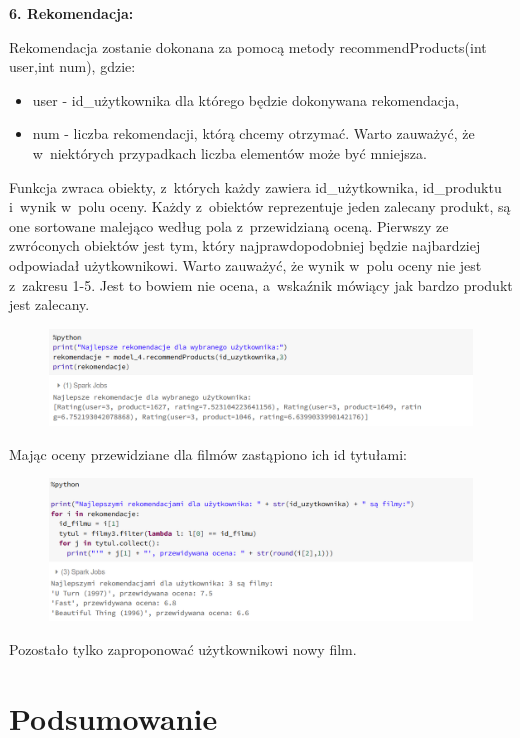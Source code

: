 \documentclass[12pt,a4paper]{report}
\begin{document}
\textbf{6. Rekomendacja:}

Rekomendacja zostanie dokonana za pomocą metody recommendProducts(int user,int num), gdzie:
\begin{itemize}
\item user - id\_użytkownika dla którego będzie dokonywana rekomendacja,
\item num - liczba rekomendacji, którą chcemy otrzymać. Warto zauważyć, że w~niektórych przypadkach liczba elementów może być mniejsza.
\end{itemize}

Funkcja zwraca obiekty, z~których każdy zawiera id\_użytkownika, id\_produktu i~wynik w~polu oceny. Każdy z~obiektów reprezentuje jeden zalecany produkt, są one sortowane malejąco według pola z~przewidzianą oceną. Pierwszy ze zwróconych obiektów jest tym, który najprawdopodobniej będzie najbardziej odpowiadał użytkownikowi. Warto zauważyć, że wynik w~polu oceny nie jest z~zakresu 1-5. Jest to bowiem nie ocena, a~wskaźnik mówiący jak bardzo produkt jest zalecany.

\begin{figure}[H]
\includegraphics[scale=0.5]{obrazy/ALS17.PNG} 
\end{figure}

Mając oceny przewidziane dla filmów zastąpiono ich id tytułami:

\begin{figure}[H]
\includegraphics[scale=0.5]{obrazy/ALS18.PNG} 
\end{figure}

Pozostało tylko zaproponować użytkownikowi nowy film.


\chapter{Podsumowanie}
\end{document}
